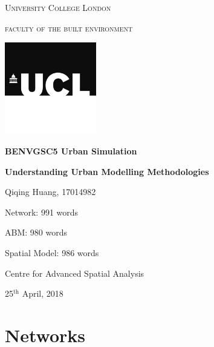 \documentclass[a4paper,reqno,]{article}
\begin{document}
\begin{titlepage}
\centering
{\scshape University College London \par}
{\scshape faculty of the built environment \par}
\vspace{1cm}
\begin{minipage}[b]{1\textwidth}
\centering
    \includegraphics[width=0.3\textwidth]{images/ucl_logo.jpg}
\end{minipage}
\newline
\newline
\newline
{\large\bfseries BENVGSC5 Urban Simulation \par}
\vspace{1.5cm}
{\huge\bfseries  Understanding Urban Modelling Methodologies\par}
\vspace{3cm}
{\large Qiqing Huang, 17014982 \par}
\vspace{1cm}
{\large Network: 991 words\par}
{\large ABM: 980 words\par}
{\large Spatial Model: 986 words\par}
\vspace{2cm}
{Centre for Advanced Spatial Analysis \par}
{25$^{\text{th}}$ April, 2018 \par}
\end{titlepage}
\tableofcontents
\newpage
\pagestyle{fancy}
\fancyhf{}
\setlength{\headheight}{25pt}
\headsep=30pt
\rfoot{\thepage}
\renewcommand{\headrulewidth}{0.4pt}

\section{Networks}
\label{sec:net}
\end{document}
